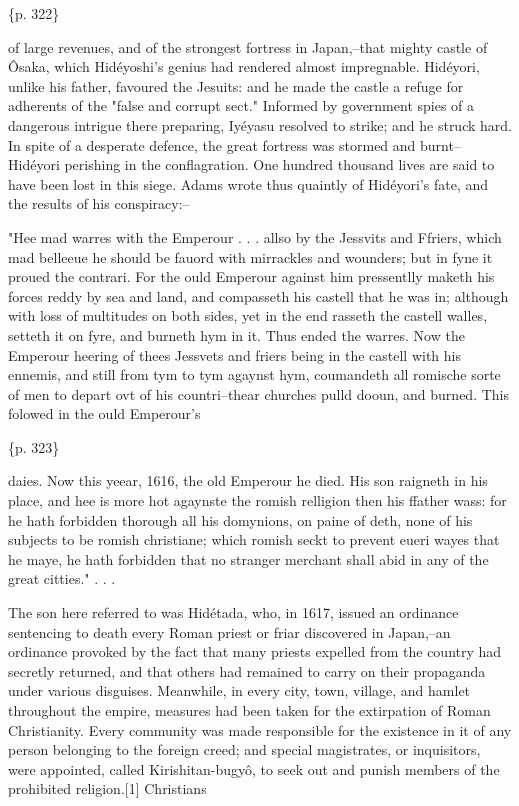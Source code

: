 \{p. 322\}

of large revenues, and of the strongest fortress in Japan,--that mighty castle of Ôsaka, which Hidéyoshi's genius had rendered almost impregnable. Hidéyori, unlike his father, favoured the Jesuits: and he made the castle a refuge for adherents of the "false and corrupt sect." Informed by government spies of a dangerous intrigue there preparing, Iyéyasu resolved to strike; and he struck hard. In spite of a desperate defence, the great fortress was stormed and burnt--Hidéyori perishing in the conflagration. One hundred thousand lives are said to have been lost in this siege. Adams wrote thus quaintly of Hidéyori's fate, and the results of his conspiracy:--

"Hee mad warres with the Emperour . . . allso by the Jessvits and Ffriers, which mad belleeue he should be fauord with mirrackles and wounders; but in fyne it proued the contrari. For the ould Emperour against him pressentlly maketh his forces reddy by sea and land, and compasseth his castell that he was in; although with loss of multitudes on both sides, yet in the end rasseth the castell walles, setteth it on fyre, and burneth hym in it. Thus ended the warres. Now the Emperour heering of thees Jessvets and friers being in the castell with his ennemis, and still from tym to tym agaynst hym, coumandeth all romische sorte of men to depart ovt of his countri--thear churches pulld dooun, and burned. This folowed in the ould Emperour's

\{p. 323\}

daies. Now this yeear, 1616, the old Emperour he died. His son raigneth in his place, and hee is more hot agaynste the romish relligion then his ffather wass: for he hath forbidden thorough all his domynions, on paine of deth, none of his subjects to be romish christiane; which romish seckt to prevent eueri wayes that he maye, he hath forbidden that no stranger merchant shall abid in any of the great citties." . . .

The son here referred to was Hidétada, who, in 1617, issued an ordinance sentencing to death every Roman priest or friar discovered in Japan,--an ordinance provoked by the fact that many priests expelled from the country had secretly returned, and that others had remained to carry on their propaganda under various disguises. Meanwhile, in every city, town, village, and hamlet throughout the empire, measures had been taken for the extirpation of Roman Christianity. Every community was made responsible for the existence in it of any person belonging to the foreign creed; and special magistrates, or inquisitors, were appointed, called Kirishitan-bugyô, to seek out and punish members of the prohibited religion.[1] Christians

